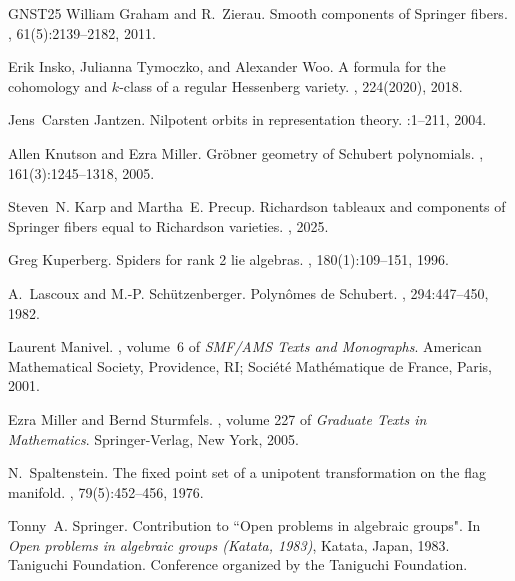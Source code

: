 \documentclass[11pt]{amsart}
\theoremstyle{remark}
\theoremstyle{remark}
\theoremstyle{definition}
\theoremstyle{definition}
\theoremstyle{definition}
\numberwithin{equation}{section}
\begin{document}
\begin{thebibliography}{GNST25}
William Graham and R.~Zierau.
\newblock Smooth components of {S}pringer fibers.
, 61(5):2139--2182, 2011.

Erik Insko, Julianna Tymoczko, and Alexander Woo.
\newblock A formula for the cohomology and $k$-class of a regular {H}essenberg variety.
, 224(2020), 2018.

Jens~Carsten Jantzen.
\newblock Nilpotent orbits in representation theory.
:1--211, 2004.

Allen Knutson and Ezra Miller.
\newblock Gr\"obner geometry of {S}chubert polynomials.
, 161(3):1245--1318, 2005.

Steven~N. Karp and Martha~E. Precup.
\newblock Richardson tableaux and components of {S}pringer fibers equal to {R}ichardson varieties.
, 2025.

Greg Kuperberg.
\newblock Spiders for rank 2 lie algebras.
, 180(1):109--151, 1996.

A.~Lascoux and M.-P. Sch\"{u}tzenberger.
\newblock Polynômes de {S}chubert.
, 294:447--450, 1982.

Laurent Manivel.
, volume~6 of {\em SMF/AMS Texts and Monographs}.
\newblock American Mathematical Society, Providence, RI; Soci\'et\'e{} Math\'ematique de France, Paris, 2001.

Ezra Miller and Bernd Sturmfels.
, volume 227 of {\em Graduate Texts in Mathematics}.
\newblock Springer-Verlag, New York, 2005.

N.~Spaltenstein.
\newblock The fixed point set of a unipotent transformation on the flag manifold.
, 79(5):452--456, 1976.

Tonny~A. Springer.
\newblock Contribution to ``{O}pen problems in algebraic groups".
\newblock In {\em Open problems in algebraic groups (Katata, 1983)}, Katata, Japan, 1983. Taniguchi Foundation.
\newblock Conference organized by the Taniguchi Foundation.


\end{thebibliography}
\end{document}

